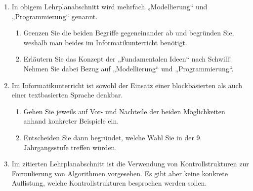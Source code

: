 \documentclass{bschlangaul-aufgabe}
\begin{document}
\begin{enumerate}


\item In obigem Lehrplanabschnitt wird mehrfach „Modellierung“ und
„Programmierung“ genannt.

\begin{enumerate}

\item Grenzen Sie die beiden Begriffe gegeneinander ab und begründen
Sie, weshalb man beides im Informatikunterricht benötigt.


\item Erläutern Sie das Konzept der „Fundamentalen Ideen“ nach Schwill!
Nehmen Sie dabei Bezug auf „Modellierung“ und „Programmierung“.
\end{enumerate}


\item Im Informatikunterricht ist sowohl der Einsatz einer
blockbasierten als auch einer textbasierten Sprache denkbar.
\begin{enumerate}


\item Gehen Sie jeweils auf Vor- und Nachteile der beiden Möglichkeiten
anhand konkreter Beispiele ein.


\item Entscheiden Sie dann begründet, welche Wahl Sie in der 9.
Jahrgangsstufe treffen würden.

\end{enumerate}


\item Im zitierten Lehrplanabschnitt ist die Verwendung von
Kontrollstrukturen zur Formulierung von Algorithmen vorgesehen. Es gibt
aber keine konkrete Auflistung, welche Kontrollstrukturen besprochen
werden sollen.
\begin{enumerate}


\end{enumerate}
\end{enumerate}
\end{document}

